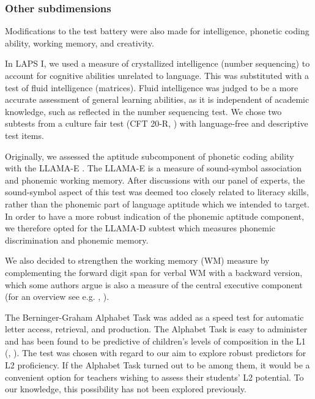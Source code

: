 \documentclass[output=paper]{langsci/langscibook}
\begin{document}
 \subsubsection{Other subdimensions}

Modifications to the test battery were also made for intelligence, phonetic coding ability, working memory, and creativity. 

In LAPS I, we used a measure of crystallized intelligence (number sequencing) to account for cognitive abilities unrelated to language. This was substituted with a test of fluid intelligence (matrices). Fluid intelligence was judged to be a more accurate assessment of general learning abilities, as it is independent of academic knowledge, such as reflected in the number sequencing test. We chose two subtests from a culture fair test (CFT 20-R, \citealt{Weiss2006}) with language-free and descriptive test items.

Originally, we assessed the aptitude subcomponent of phonetic coding ability with the LLAMA-E \citep{MearaEtAl2001}. The LLAMA-E is a measure of sound-symbol association and phonemic working memory. After discussions with our panel of experts, the sound-symbol aspect of this test was deemed too closely related to literacy skills, rather than the phonemic part of language aptitude which we intended to target. In order to have a more robust indication of the phonemic aptitude component, we therefore opted for the LLAMA-D subtest \citep{MearaEtAl2001} which measures phonemic discrimination and phonemic memory. 

We also decided to strengthen the working memory (WM) measure by complementing the forward digit span for verbal WM with a backward version, which some authors argue is also a measure of the central executive component (for an overview see e.g. \citealt{St-ClairEtAl2013}, \citealt{HilbertEtAl2014}). 

The Berninger-Graham Alphabet Task \citep{BerningerEtAl1992} was added as a speed test for automatic letter access, retrieval, and production. The Alphabet Task is easy to administer and has been found to be predictive of children’s levels of composition in the L1 (\citealt{BerningerEtAl1997}, \citealt{GrahamEtAl2006}). The test was chosen with regard to our aim to explore robust predictors for L2 proficiency. If the Alphabet Task turned out to be among them, it would be a convenient option for teachers wishing to assess their students’ L2 potential. To our knowledge, this possibility has not been explored previously.
\end{document}
